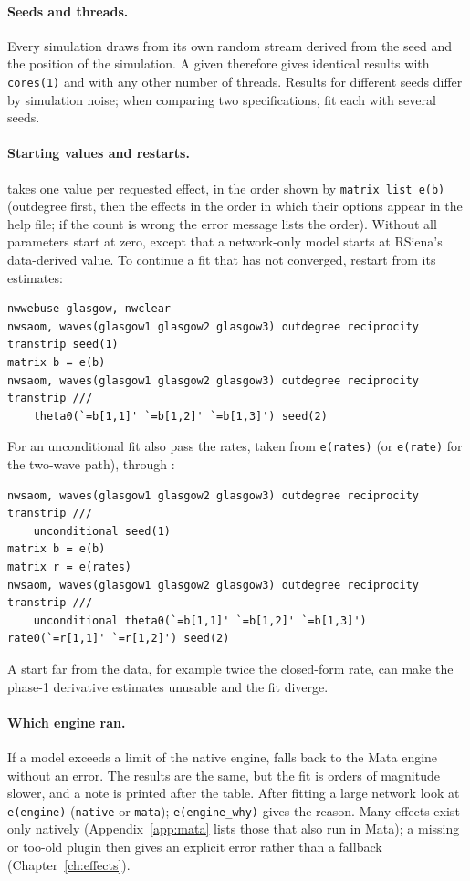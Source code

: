 \paragraph{Seeds and threads.} Every simulation draws from its own random stream derived from the seed and the position of the simulation. A given  therefore gives identical results with \texttt{cores(1)} and with any other number of threads. Results for different seeds differ by simulation noise; when comparing two specifications, fit each with several seeds.

\paragraph{Starting values and restarts.}  takes one value per requested effect, in the order shown by \texttt{matrix list e(b)} (outdegree first, then the effects in the order in which their options appear in the help file; if the count is wrong the error message lists the order). Without  all parameters start at zero, except that a network-only model starts  at RSiena's data-derived value. To continue a fit that has not converged, restart from its estimates:
\begin{lstlisting}
nwwebuse glasgow, nwclear
nwsaom, waves(glasgow1 glasgow2 glasgow3) outdegree reciprocity transtrip seed(1)
matrix b = e(b)
nwsaom, waves(glasgow1 glasgow2 glasgow3) outdegree reciprocity transtrip ///
    theta0(`=b[1,1]' `=b[1,2]' `=b[1,3]') seed(2)
\end{lstlisting}
For an unconditional fit also pass the rates, taken from \texttt{e(rates)} (or \texttt{e(rate)} for the two-wave path), through :
\begin{lstlisting}
nwsaom, waves(glasgow1 glasgow2 glasgow3) outdegree reciprocity transtrip ///
    unconditional seed(1)
matrix b = e(b)
matrix r = e(rates)
nwsaom, waves(glasgow1 glasgow2 glasgow3) outdegree reciprocity transtrip ///
    unconditional theta0(`=b[1,1]' `=b[1,2]' `=b[1,3]') rate0(`=r[1,1]' `=r[1,2]') seed(2)
\end{lstlisting}
A start far from the data, for example twice the closed-form rate, can make the phase-1 derivative estimates unusable and the fit diverge.

\paragraph{Which engine ran.} If a model exceeds a limit of the native engine, \nwsaom{} falls back to the Mata engine without an error. The results are the same, but the fit is orders of magnitude slower, and a note is printed after the table. After fitting a large network look at \texttt{e(engine)} (\texttt{native} or \texttt{mata}); \texttt{e(engine\_why)} gives the reason. Many effects exist only natively (Appendix~\ref{app:mata} lists those that also run in Mata); a missing or too-old plugin then gives an explicit error rather than a fallback (Chapter~\ref{ch:effects}).

